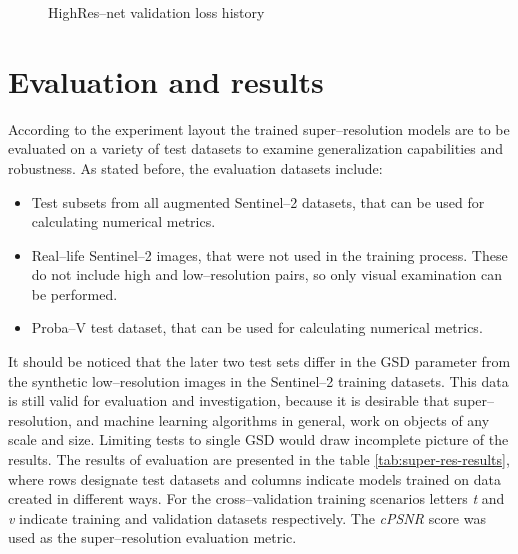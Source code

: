 \begin{figure}
    \centering
    \caption{HighRes--net validation loss history}
    \label{fig:highres-net-training-validation}
\end{figure}

\section{Evaluation and results}
According to the experiment layout the trained super--resolution models are to be evaluated on a variety of test datasets to examine generalization capabilities and robustness.
As stated before, the evaluation datasets include:
\begin{itemize}
	\item Test subsets from all augmented Sentinel--2 datasets, that can be used for calculating numerical metrics.
	\item Real--life Sentinel--2 images, that were not used in the training process. These do not include high and low--resolution pairs, so only visual examination can be performed.
	\item Proba--V test dataset, that can be used for calculating numerical metrics.
\end{itemize}
It should be noticed that the later two test sets differ in the GSD parameter from the synthetic low--resolution images in the Sentinel--2 training datasets.
This data is still valid for evaluation and investigation, because it is desirable that super--resolution, and machine learning algorithms in general, work on objects of any scale and size.
Limiting tests to single GSD would draw incomplete picture of the results.
The results of evaluation are presented in the table \ref{tab:super-res-results}, where rows designate test datasets and columns indicate models trained on data created in different ways.
For the cross--validation training scenarios letters \textit{t} and \textit{v} indicate training and validation datasets respectively.
The \textit{cPSNR} score was used as the super--resolution evaluation metric.


